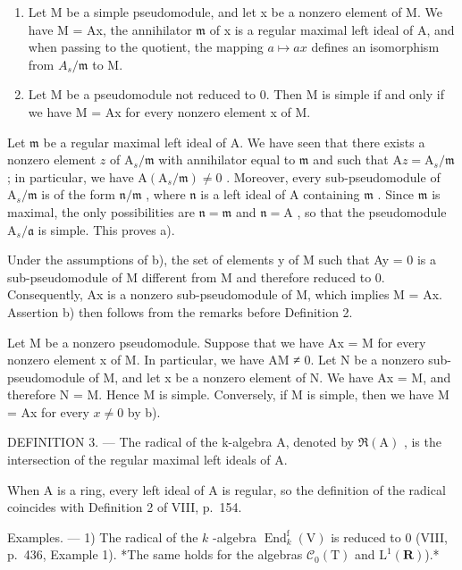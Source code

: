 \begin{enumerate}
\def\labelenumi{\alph{enumi})}
\setcounter{enumi}{1}
\item
  Let M be a simple pseudomodule, and let x be a nonzero element of M. We have M = Ax, the annihilator \(\mathfrak{m}\) of x is a regular maximal left ideal of A, and when passing to the quotient, the mapping \(a \mapsto ax\) defines an isomorphism from \(A_{s}/\mathfrak{m}\) to M.
\item
  Let M be a pseudomodule not reduced to 0. Then M is simple if and only if we have M = Ax for every nonzero element x of M.
\end{enumerate}

Let \(\mathfrak{m}\) be a regular maximal left ideal of A. We have seen that there exists a nonzero element \(z\) of \(\mathrm{A}_s / \mathfrak{m}\) with annihilator equal to \(\mathfrak{m}\) and such that \(\mathrm{A}z = \mathrm{A}_s / \mathfrak{m}\) ; in particular, we have \(\mathrm{A}(\mathrm{A}_s / \mathfrak{m}) \neq 0\) . Moreover, every sub-pseudomodule of \(\mathrm{A}_s / \mathfrak{m}\) is of the form \(\mathfrak{n} / \mathfrak{m}\) , where \(\mathfrak{n}\) is a left ideal of A containing \(\mathfrak{m}\) . Since \(\mathfrak{m}\) is maximal, the only possibilities are \(\mathfrak{n} = \mathfrak{m}\) and \(\mathfrak{n} = \mathrm{A}\) , so that the pseudomodule \(\mathrm{A}_s / \mathfrak{a}\) is simple. This proves a).

Under the assumptions of b), the set of elements y of M such that Ay = 0 is a sub-pseudomodule of M different from M and therefore reduced to 0. Consequently, Ax is a nonzero sub-pseudomodule of M, which implies M = Ax. Assertion b) then follows from the remarks before Definition 2.

Let M be a nonzero pseudomodule. Suppose that we have Ax = M for every nonzero element x of M. In particular, we have AM ≠ 0. Let N be a nonzero sub-pseudomodule of M, and let x be a nonzero element of N. We have Ax = M, and therefore N = M. Hence M is simple. Conversely, if M is simple, then we have M = Ax for every \(x \neq 0\) by b).

DEFINITION 3. --- The radical of the k-algebra A, denoted by \(\Re(\mathrm{A})\) , is the intersection of the regular maximal left ideals of A.

When A is a ring, every left ideal of A is regular, so the definition of the radical coincides with Definition 2 of VIII, p.~154.

Examples. --- 1) The radical of the \(k\) -algebra \(\operatorname{End}_k^{\mathrm{f}}(\mathrm{V})\) is reduced to 0 (VIII, p.~436, Example 1). *The same holds for the algebras \(\mathcal{C}_0(\mathrm{T})\) and \(\mathrm{L}^1 (\mathbf{R})\)).*

